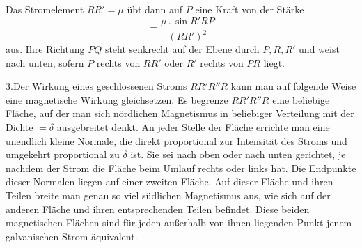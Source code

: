Das Stromelement $RR'=\mu$ übt dann auf $P$ eine Kraft von der Stärke
\[
=\frac{\mu\,.\,\sin R'RP}{(RR')^2}
\]
aus. Ihre Richtung $PQ$ steht senkrecht auf der Ebene durch $P,R,R'$ und weist nach unten, sofern $P$ rechts von $RR'$ oder $R'$ rechts von $PR$ liegt.
\par
{}
3.\quad Der Wirkung eines geschlossenen Stroms $RR'R''R$ kann man auf folgende Weise eine magnetische Wirkung gleichsetzen. Es begrenze $RR'R''R$ eine beliebige Fläche, auf der man sich nördlichen Magnetismus in beliebiger Verteilung mit der Dichte $=\delta$ ausgebreitet denkt. An jeder Stelle der Fläche errichte man eine unendlich kleine Normale, die direkt proportional zur Intensität des Stroms und umgekehrt proportional zu $\delta$ ist. Sie sei nach oben oder nach unten gerichtet, je nachdem der Strom die Fläche beim Umlauf rechts oder links hat. Die Endpunkte dieser Normalen liegen auf einer zweiten Fläche. Auf dieser Fläche und ihren Teilen breite man genau so viel südlichen Magnetismus aus, wie sich auf der anderen Fläche und ihren entsprechenden Teilen befindet. Diese beiden magnetischen Flächen sind für jeden außerhalb von ihnen liegenden Punkt jenem galvanischen Strom äquivalent.

